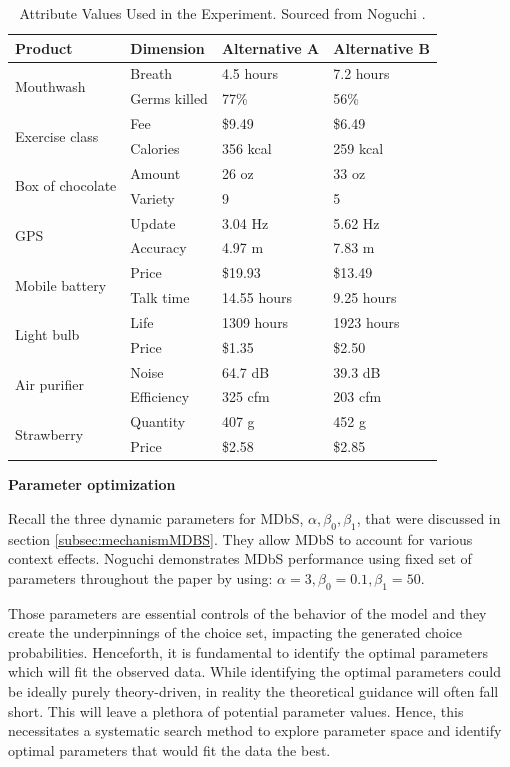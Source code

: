 \documentclass[a4paper,12pt]{article}
\newcommand{\citeyearonly}[1]{\citeyearpar{#1}}
\begin{document}
\begin{table}
\centering

\begin{tabular}{l|lll}
\hline
Product & Dimension & Alternative A & Alternative B \\
\hline
\multirow{2}{*}{Mouthwash} & Breath & 4.5 hours & 7.2 hours \\
 & Germs killed & 77\% & 56\% \\[2ex]
\multirow{2}{*}{Exercise class} & Fee & \$9.49 & \$6.49 \\
 & Calories & 356 kcal & 259 kcal \\[2ex]
\multirow{2}{*}{Box of chocolate} & Amount & 26 oz & 33 oz \\
 & Variety & 9 & 5 \\[2ex]
\multirow{2}{*}{GPS} & Update & 3.04 Hz & 5.62 Hz \\
 & Accuracy & 4.97 m & 7.83 m \\[2ex]
\multirow{2}{*}{Mobile battery} & Price & \$19.93 & \$13.49 \\
 & Talk time & 14.55 hours & 9.25 hours \\[2ex]
\multirow{2}{*}{Light bulb} & Life & 1309 hours & 1923 hours \\
 & Price & \$1.35 & \$2.50 \\[2ex]
\multirow{2}{*}{Air purifier} & Noise & 64.7 dB & 39.3 dB \\
 & Efficiency & 325 cfm & 203 cfm \\[2ex]
\multirow{2}{*}{Strawberry} & Quantity & 407 g & 452 g \\
 & Price & \$2.58 & \$2.85 \\
\hline
\end{tabular}
\caption{Attribute Values Used in the Experiment. Sourced from Noguchi \citeyearonly{noguchi2018multialternative}.}
\label{tab:noguchiDescriptions}
\end{table}

\textbf{Parameter optimization}

Recall the three dynamic parameters for MDbS, $\alpha, \beta_0, \beta_1$, that were discussed in section \ref{subsec:mechanismMDBS}. They allow MDbS to account for various context effects. Noguchi \citeyearonly{noguchi2018multialternative} demonstrates MDbS performance using fixed set of parameters throughout the paper by using: $\alpha = 3, \beta_0 = 0.1, \beta_1 = 50$. 

Those parameters are essential controls of the behavior of the model and they create the underpinnings of the choice set, impacting the generated choice probabilities. Henceforth, it is fundamental to identify the optimal parameters which will fit the observed data. While identifying the optimal parameters could be ideally purely theory-driven, in reality the theoretical guidance will often fall short. This will leave a plethora of potential parameter values. Hence, this necessitates a systematic search method to explore parameter space and identify optimal parameters that would fit the data the best.
\end{document}
